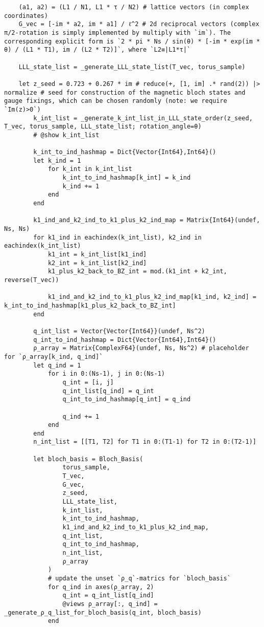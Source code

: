 \begin{verbatim}
    (a1, a2) = (L1 / N1, L1 * τ / N2) # lattice vectors (in complex coordinates)
    G_vec = [-im * a2, im * a1] / ℓ^2 # 2d reciprocal vectors (complex π/2-rotation is simply implemented by multiply with `im`). The corresponding explicit form is `2 * pi * Ns / sin(θ) * [-im * exp(im * θ) / (L1 * T1), im / (L2 * T2)]`, where `L2≡|L1*τ|`

    LLL_state_list = _generate_LLL_state_list(T_vec, torus_sample)

    let z_seed = 0.723 + 0.267 * im # reduce(+, [1, im] .* rand(2)) |> normalize # seed for construction of the magnetic bloch states and gauge fixings, which can be chosen randomly (note: we require `Im(z)>0`) 
        k_int_list = _generate_k_int_list_in_LLL_state_order(z_seed, T_vec, torus_sample, LLL_state_list; rotation_angle=θ)
        # @show k_int_list

        k_int_to_ind_hashmap = Dict{Vector{Int64},Int64}()
        let k_ind = 1
            for k_int in k_int_list
                k_int_to_ind_hashmap[k_int] = k_ind
                k_ind += 1
            end
        end

        k1_ind_and_k2_ind_to_k1_plus_k2_ind_map = Matrix{Int64}(undef, Ns, Ns)
        for k1_ind in eachindex(k_int_list), k2_ind in eachindex(k_int_list)
            k1_int = k_int_list[k1_ind]
            k2_int = k_int_list[k2_ind]
            k1_plus_k2_back_to_BZ_int = mod.(k1_int + k2_int, reverse(T_vec))

            k1_ind_and_k2_ind_to_k1_plus_k2_ind_map[k1_ind, k2_ind] = k_int_to_ind_hashmap[k1_plus_k2_back_to_BZ_int]
        end

        q_int_list = Vector{Vector{Int64}}(undef, Ns^2)
        q_int_to_ind_hashmap = Dict{Vector{Int64},Int64}()
        ρ_array = Matrix{ComplexF64}(undef, Ns, Ns^2) # placeholder for `ρ_array[k_ind, q_ind]`
        let q_ind = 1
            for i in 0:(Ns-1), j in 0:(Ns-1)
                q_int = [i, j]
                q_int_list[q_ind] = q_int
                q_int_to_ind_hashmap[q_int] = q_ind

                q_ind += 1
            end
        end
        n_int_list = [[T1, T2] for T1 in 0:(T1-1) for T2 in 0:(T2-1)]

        let bloch_basis = Bloch_Basis(
                torus_sample,
                T_vec,
                G_vec,
                z_seed,
                LLL_state_list,
                k_int_list,
                k_int_to_ind_hashmap,
                k1_ind_and_k2_ind_to_k1_plus_k2_ind_map,
                q_int_list,
                q_int_to_ind_hashmap,
                n_int_list,
                ρ_array
            )
            # update the unset `ρ_q`-matrics for `bloch_basis`
            for q_ind in axes(ρ_array, 2)
                q_int = q_int_list[q_ind]
                @views ρ_array[:, q_ind] = _generate_ρ_q_list_for_bloch_basis(q_int, bloch_basis)
            end


\end{verbatim}
